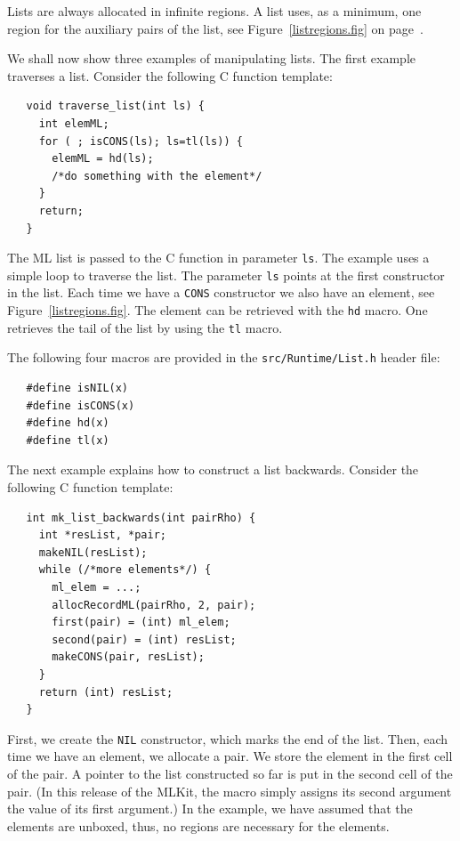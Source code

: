 \documentclass[12pt]{book}
\begin{document}
Lists are always allocated in infinite regions. A list uses, as a minimum,
one region for the auxiliary pairs of the list, see Figure~\ref{listregions.fig} on page~\pageref{listregions.fig}.

We shall now show three examples of manipulating lists. The first example
traverses a list. Consider the following C function template:
%
\begin{verbatim}
   void traverse_list(int ls) {
     int elemML;
     for ( ; isCONS(ls); ls=tl(ls)) {
       elemML = hd(ls);
       /*do something with the element*/
     }
     return;
   }
\end{verbatim}

The ML list is passed to the C function in parameter \texttt{ls}.
The example uses a simple loop to traverse the list. The parameter
\texttt{ls} points at the first constructor in the list. Each time
we have a \texttt{CONS} constructor we also have an element, see
Figure~\ref{listregions.fig}. The element can be retrieved with the
\texttt{hd} macro.  One retrieves the tail of the list by using the
\texttt{tl} macro.

The following four macros are provided in the {\tt src/Runtime/List.h}
header file:
%
%
%
%
\begin{verbatim}
   #define isNIL(x)
   #define isCONS(x)
   #define hd(x)
   #define tl(x)
\end{verbatim}
                                
The next example explains how to construct a list backwards. Consider
the following C function template:
%
\begin{verbatim}
   int mk_list_backwards(int pairRho) {
     int *resList, *pair;
     makeNIL(resList);  
     while (/*more elements*/) {
       ml_elem = ...;
       allocRecordML(pairRho, 2, pair);
       first(pair) = (int) ml_elem;
       second(pair) = (int) resList;
       makeCONS(pair, resList);
     }
     return (int) resList;
   }
\end{verbatim}
First, we create the \texttt{NIL} constructor, which marks the end of
the list. Then, each time we have an element, we allocate a pair. We
store the element in the first cell of the pair. A pointer to the list
constructed so far is put in the second cell of the pair. (In this
release of the MLKit, the  macro simply assigns its
second argument the value of its first argument.) In the example, we
have assumed that the elements are unboxed, thus, no regions are
necessary for the elements.
\end{document}
